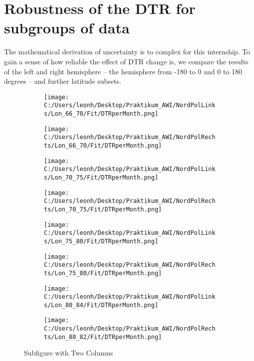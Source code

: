 \section[Robustness]{Robustness of the DTR for subgroups of data}
\label{sec:robustness}


The mathematical derivation of uncertainty is to complex for this internship.
To gain a sense of how reliable the effect of DTR change is, we compare the 
results of the left and right hemisphere  -- the hemisphere from -180 to 0 and 0 to 180 degrees -- and further latitude subsets. 

\begin{figure}[ht]
    \centering
    \begin{subfigure}{0.48\textwidth}
        \centering
        \texttt{[image: C:/Users/leonh/Desktop/Praktikum\_AWI/NordPolLinks/Lon\_66\_70/Fit/DTRperMonth.png]}
    \end{subfigure}%
    \begin{subfigure}{0.48\textwidth}
        \centering
        \texttt{[image: C:/Users/leonh/Desktop/Praktikum\_AWI/NordPolRechts/Lon\_66\_70/Fit/DTRperMonth.png]}
    
    \end{subfigure}

    \begin{subfigure}{0.48\textwidth}
        \centering
        \texttt{[image: C:/Users/leonh/Desktop/Praktikum\_AWI/NordPolLinks/Lon\_70\_75/Fit/DTRperMonth.png]}
    \end{subfigure}%
    \begin{subfigure}{0.48\textwidth}
        \centering
        \texttt{[image: C:/Users/leonh/Desktop/Praktikum\_AWI/NordPolRechts/Lon\_70\_75/Fit/DTRperMonth.png]}
    \end{subfigure}

    \begin{subfigure}{0.48\textwidth}
        \centering
        \texttt{[image: C:/Users/leonh/Desktop/Praktikum\_AWI/NordPolLinks/Lon\_75\_80/Fit/DTRperMonth.png]}
    \end{subfigure}%
    \begin{subfigure}{0.48\textwidth}
        \centering
        \texttt{[image: C:/Users/leonh/Desktop/Praktikum\_AWI/NordPolRechts/Lon\_75\_80/Fit/DTRperMonth.png]}
    \end{subfigure}
    
    \begin{subfigure}{0.48\textwidth}
        \centering
        \texttt{[image: C:/Users/leonh/Desktop/Praktikum\_AWI/NordPolLinks/Lon\_80\_84/Fit/DTRperMonth.png]}
    \end{subfigure}%
    \begin{subfigure}{0.48\textwidth}
        \centering
        \texttt{[image: C:/Users/leonh/Desktop/Praktikum\_AWI/NordPolRechts/Lon\_80\_82/Fit/DTRperMonth.png]}
    \end{subfigure}

    \caption{Subfigure with Two Columns}
    \label{fig:DTRleftright}
\end{figure}

